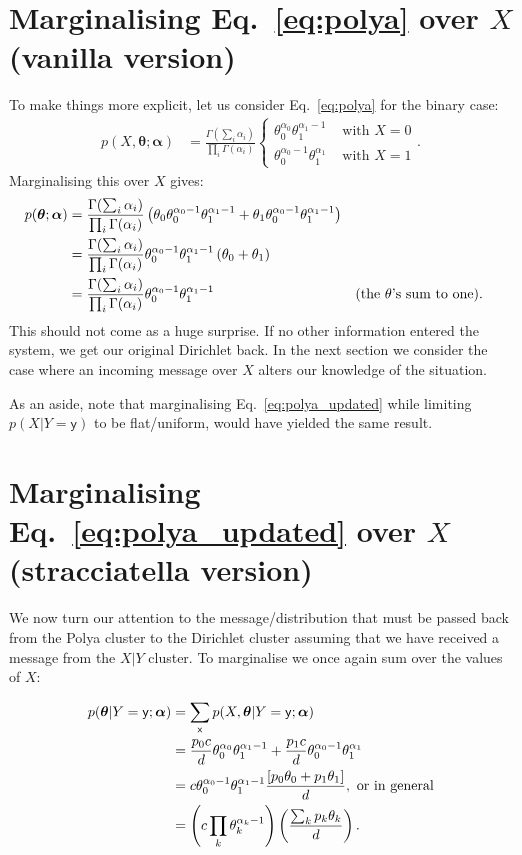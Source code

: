 \documentclass[oneside,english]{scrbook}
\begin{document}
\section{Marginalising Eq.~\ref{eq:polya} over $X$ (vanilla version)}
To make things more explicit, let us consider Eq.~\ref{eq:polya} for the binary case:
\begin{align*}
  p(X,\bm{\theta};\bm{\alpha}) &= \frac{\Gamma(\sum_i\alpha_i)}{\prod_i\Gamma(\alpha_i)}\left\{
    \begin{array}{lr}
    \theta_0^{\alpha_0}\theta_1^{\alpha_1-1} & \mbox{ with } X=0\\
    \theta_0^{\alpha_0-1}\theta_1^{\alpha_1} & \mbox{ with } X=1
\end{array}
\right..
\end{align*}
Marginalising this over $X$ gives:
\begin{align}
  p(\bm{\theta};\bm{\alpha})
  &= \frac{\Gamma(\sum_i\alpha_i)}{\prod_i\Gamma(\alpha_i)}
  \left(\theta_0\theta_0^{\alpha_0-1}\theta_1^{\alpha_1-1} + \theta_1\theta_0^{\alpha_0-1}\theta_1^{\alpha_1-1}\right) \notag\\
  &= \frac{\Gamma(\sum_i\alpha_i)}{\prod_i\Gamma(\alpha_i)}
  \theta_0^{\alpha_0-1}\theta_1^{\alpha_1-1}
  \left(\theta_0+\theta_1\right) \notag\\
  &= \frac{\Gamma(\sum_i\alpha_i)}{\prod_i\Gamma(\alpha_i)}
  \theta_0^{\alpha_0-1}\theta_1^{\alpha_1-1} && \text{(the $\theta$'s sum to one)}.
\end{align}
This should not come as a huge surprise. If no other information
entered the system, we get our original Dirichlet back. In the next
section we consider the case where an incoming message over $X$ alters
our knowledge of the situation.

As an aside, note that marginalising Eq.~\ref{eq:polya_updated} while
limiting $p(X|Y=\mathsf{y})$ to be flat/uniform, would have yielded
the same result.

\section{Marginalising Eq.~\ref{eq:polya_updated} over $X$ (stracciatella version)}

We now turn our attention to the message/distribution that must be
passed back from the Polya cluster to the Dirichlet cluster assuming
that we have received a message from the $X|Y$ cluster. To marginalise
we once again sum over the values of $X$:

\begin{align}
  p(\bm{\theta}|Y=\mathsf{y};\bm{\alpha})
  &= \sum_{\mathsf{x}} p(X,\bm{\theta}|Y=\mathsf{y};\bm{\alpha}) \notag \\
  &= \frac{p_0c}{d}\theta_0^{\alpha_0}\theta_1^{\alpha_1-1} + \frac{p_1c}{d}\theta_0^{\alpha_0-1}\theta_1^{\alpha_1} \notag\\
  &= c\theta_0^{\alpha_0-1}\theta_1^{\alpha_1-1}\frac{\left[p_0\theta_0+p_1\theta_1 \right]}{d}, \text{ or in general}\notag\\
  &= \left(c\prod_k\theta_k^{\alpha_k-1}\right)\left(\frac{\sum_kp_k\theta_k}{d}\right). \label{eq:dirich_true_post}
\end{align}
\end{document}
